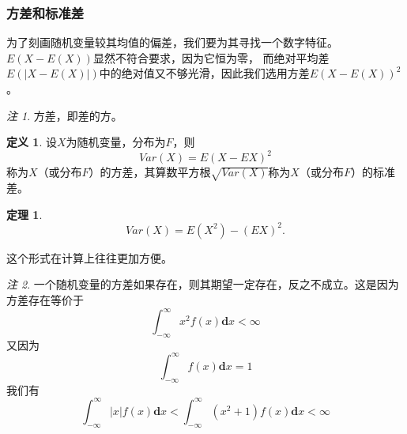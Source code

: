 \documentclass[a4paper,11pt]{article}%
\theoremstyle{remark}
\newtheorem*{remark}{注}
\theoremstyle{remark}
\theoremstyle{definition}
\newtheorem{theorem}{定理}[section]
\theoremstyle{definition}
\newtheorem*{definition}{定义}
\theoremstyle{plain}
\newcommand*{\abs}[1]{\lvert #1 \rvert}
\begin{document}
\subsubsection{方差和标准差}
为了刻画随机变量较其均值的偏差，我们要为其寻找一个数字特征。$E(X-E(X))$显然不符合要求，因为它恒为零，
而绝对平均差$E(\abs{X-E(X)})$中的绝对值又不够光滑，因此我们选用方差$E(X-E(X))^2$。
\begin{remark}
    方差，即差的方。
\end{remark}
\begin{definition}
    设$X$为随机变量，分布为$F$，则 
    \[Var(X)=E(X-EX)^2\]
    称为$X$（或分布$F$）的方差，其算数平方根$\sqrt{Var(X)}$称为$X$（或分布$F$）的标准差。
\end{definition}
\begin{theorem}
    \[Var(X)=E(X^2)-(EX)^2.\]
\end{theorem}
这个形式在计算上往往更加方便。
\begin{remark}
    一个随机变量的方差如果存在，则其期望一定存在，反之不成立。这是因为方差存在等价于
    \[\int_{-\infty}^{\infty}x^2f(x)\mathbf{d}x<\infty\]
    又因为
    \[\int_{-\infty}^{\infty}f(x)\mathbf{d}x=1\]
    我们有
    \[\int_{-\infty}^{\infty}\abs{x}f(x)\mathbf{d}x<\int_{-\infty}^{\infty}(x^2+1)f(x)\mathbf{d}x<\infty\]
\end{remark}
\end{document}
